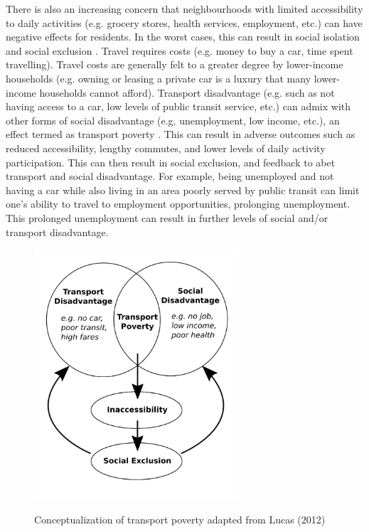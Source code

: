 There is also an increasing concern that neighbourhoods with limited accessibility to daily activities (e.g. grocery stores, health services, employment, etc.) can have negative effects for residents. In the worst cases, this can result in social isolation and social exclusion \cite{ades_are_2012,lucas_transport_2012,lucas_is_2018}. Travel requires costs (e.g. money to buy a car, time spent travelling). Travel costs are generally felt to a greater degree by lower-income households (e.g. owning or leasing a private car is a luxury that many lower-income households cannot afford). Transport disadvantage (e.g. such as not having access to a car, low levels of public transit service, etc.) can admix with other forms of social disadvantage (e.g. unemployment, low income, etc.), an effect termed as transport poverty \cite{lucas_transport_2012, allen_sizing_2019}. This can result in adverse outcomes such as reduced accessibility, lengthy commutes, and lower levels of daily activity participation. This can then result in social exclusion, and feedback to abet transport and social disadvantage. For example, being unemployed and not having a car while also living in an area poorly served by public transit can limit one's ability to travel to employment opportunities, prolonging unemployment. This prolonged unemployment can result in further levels of social and/or transport disadvantage. 

\begin{figure}[h]
	\centering
	\caption{Conceptualization of transport poverty adapted from Lucas (2012)}
	\includegraphics[width=3in]{figures/tpov.png}
	\label{tpov}
\end{figure}

